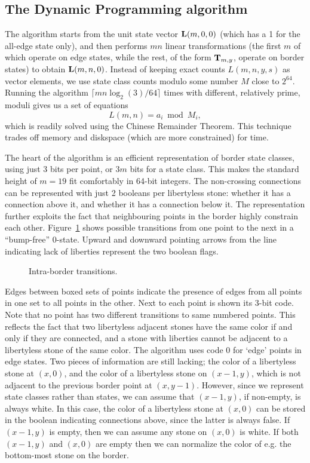 \documentclass{article}
\begin{document}
\subsection{The Dynamic Programming algorithm}
\label{DP-algorithm}

The algorithm starts from the unit state vector $\mathbf{L}(m,0,0)$
(which has a 1 for the all-edge state only),
and then performs $mn$ linear transformations
(the first $m$ of which operate on edge states, while the rest,
of the form $\mathbf{T}_{m,y}$, operate on border states)
to obtain $\mathbf{L}(m,n,0)$.
Instead of keeping exact counts $L(m,n,y,s)$ as vector elements,
we use state class counts modulo some number $M$ close to $2^{64}$.
Running the algorithm $\lceil mn \log_2(3) / 64\rceil$
times with different, relatively prime, moduli
gives us a set of equations \[L(m,n) = a_i \bmod M_i,\]
which is readily solved using the Chinese Remainder Theorem.
This technique trades off memory and diskspace (which are more constrained)
for time.

The heart of the algorithm is an efficient representation of
border state classes, using just 3 bits per point, or $3m$ bits for
a state class. This makes the standard height of $m=19$ fit
comfortably in 64-bit integers.
The non-crossing connections can be represented with just 2 booleans
per libertyless stone: whether it has a connection above it, and whether
it has a connection below it.
The representation further exploits the fact that neighbouring points
in the border highly constrain each other. Figure~\ref{borderdfa}
shows possible transitions from one point to the next in a ``bump-free''
$0$-state. Upward and downward pointing arrows from the line
indicating lack of liberties represent the two boolean flags.

\begin{figure}
\begin{center}
\epsfxsize=10cm 
\end{center}
\caption{Intra-border transitions.}
\label{borderdfa}
\end{figure}

Edges between boxed sets of points indicate the presence of edges from all
points in one set to all points in the other.
Next to each point is shown its 3-bit code. Note that no point
has two different transitions to same numbered points. 
This reflects the fact that two libertyless adjacent stones have the same
color if and only if they are connected, and a stone with liberties cannot
be adjacent to a libertyless stone of the same color.
The algorithm uses code 0 for `edge' points in edge states.
Two pieces of information are still lacking; the color of a libertyless
stone at $(x,0)$, and the color of a libertyless stone on $(x-1,y)$, which
is not adjacent to the previous border point at $(x,y-1)$.
However, since we represent state classes rather than states, we can
assume that $(x-1,y)$, if non-empty, is always white.
In this case, the color of a libertyless stone at $(x,0)$ can be stored
in the boolean indicating connections above, since the latter is always false.
If $(x-1,y)$ is empty, then we can assume any stone on $(x,0)$ is white.
If both $(x-1,y)$ and $(x,0)$ are empty then we can normalize
the color of e.g. the bottom-most stone on the border.
\end{document}
